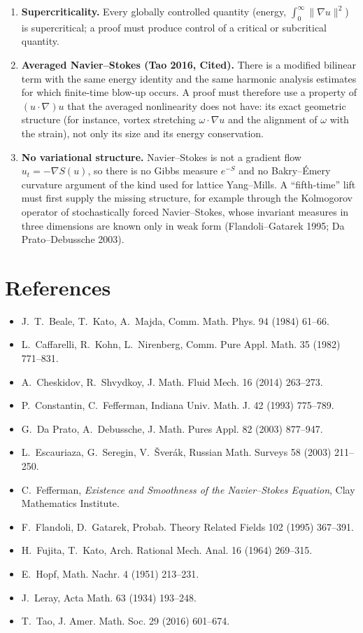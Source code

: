 \documentclass[11pt]{article}
\theoremstyle{definition}
\theoremstyle{remark}
\begin{document}
\begin{enumerate}
\item \textbf{Supercriticality.} Every globally controlled quantity
(energy, $\int_0^\infty\|\nabla u\|^2$) is supercritical; a proof must
produce control of a critical or subcritical quantity.
\item \textbf{Averaged Navier--Stokes (Tao 2016, Cited).} There is a
modified bilinear term with the same energy identity and the same harmonic
analysis estimates for which finite-time blow-up occurs. A proof must
therefore use a property of $(u\cdot\nabla)u$ that the averaged
nonlinearity does not have: its exact geometric structure (for instance,
vortex stretching $\omega\cdot\nabla u$ and the alignment of $\omega$ with
the strain), not only its size and its energy conservation.
\item \textbf{No variational structure.} Navier--Stokes is not a gradient
flow $u_t=-\nabla S(u)$, so there is no Gibbs measure $e^{-S}$ and no
Bakry--\'Emery curvature argument of the kind used for lattice Yang--Mills.
A ``fifth-time'' lift must first supply the missing structure, for example
through the Kolmogorov operator of stochastically forced Navier--Stokes,
whose invariant measures in three dimensions are known only in weak form
(Flandoli--Gatarek 1995; Da Prato--Debussche 2003).
\end{enumerate}

\section*{References}
\begin{itemize}
\item J.~T.~Beale, T.~Kato, A.~Majda, Comm. Math. Phys. 94 (1984) 61--66.
\item L.~Caffarelli, R.~Kohn, L.~Nirenberg, Comm. Pure Appl. Math. 35 (1982) 771--831.
\item A.~Cheskidov, R.~Shvydkoy, J. Math. Fluid Mech. 16 (2014) 263--273.
\item P.~Constantin, C.~Fefferman, Indiana Univ. Math. J. 42 (1993) 775--789.
\item G.~Da Prato, A.~Debussche, J. Math. Pures Appl. 82 (2003) 877--947.
\item L.~Escauriaza, G.~Seregin, V.~\v{S}ver\'ak, Russian Math. Surveys 58 (2003) 211--250.
\item C.~Fefferman, \emph{Existence and Smoothness of the Navier--Stokes Equation}, Clay Mathematics Institute.
\item F.~Flandoli, D.~Gatarek, Probab. Theory Related Fields 102 (1995) 367--391.
\item H.~Fujita, T.~Kato, Arch. Rational Mech. Anal. 16 (1964) 269--315.
\item E.~Hopf, Math. Nachr. 4 (1951) 213--231.
\item J.~Leray, Acta Math. 63 (1934) 193--248.
\item T.~Tao, J. Amer. Math. Soc. 29 (2016) 601--674.
\end{itemize}
\end{document}
